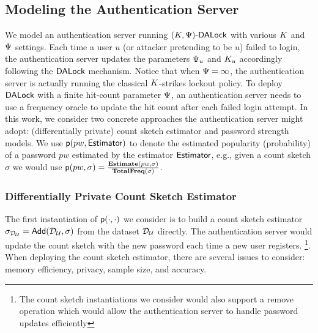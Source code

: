 



\vspace*{-\baselineskip}
\subsection{Modeling the Authentication Server}\label{section:ExperimentDesign-subsection:SimulateServer} %


We model an authentication server running $(K, \Psi)\text{-}\mathsf{DALock}$ with various $K$ and $\Psi$ settings. Each time a user $u$ (or attacker pretending to be $u$) failed to login, the authentication server updates the parameters $\Psi_{u}$ and $K_{u}$ accordingly following the $\mathsf{DALock}$ mechanism. Notice that when $ \Psi = \infty$, the authentication server is actually running the classical $K$-strikes lockout policy. To deploy $\mathsf{DALock}$ with a finite hit-count parameter $ \Psi$, an authentication server needs to use a frequency oracle to update the hit count after each failed login attempt.  In this work, we consider two concrete approaches the authentication server might adopt: (differentially private) count sketch estimator and password strength models. We use $\textsf{p}(pw,\mathsf{Estimator})$ to denote the estimated popularity (probability) of a password $pw$ estimated by the estimator $\mathsf{Estimator}$, e.g., given a count sketch $\sigma$ we would use  $\textsf{p}(pw,\sigma) = \frac{\mathbf{Estimate}(pw,\sigma)}{\mathbf{TotalFreq(\sigma)}}$. 






\subsubsection{Differentially Private Count Sketch Estimator} 


The first instantiation of $\textsf{p}(\cdot,\cdot) $ we consider is to build a count sketch estimator $\sigma_{\mathcal{D}_{{\mathcal{U}}}} = \mathsf{Add}(\mathcal{D}_{{\mathcal{U}}},\sigma) $ from the dataset $\mathcal{D}_{{\mathcal{U}}} $ directly. The authentication server would update the count sketch with the new password each time a new user registers. \footnote{The count sketch instantiations we consider would also support a remove operation which would allow the authentication server to handle password updates efficiently}. When deploying the count sketch estimator, there are several issues to consider: memory efficiency, privacy, sample size, and accuracy. 



